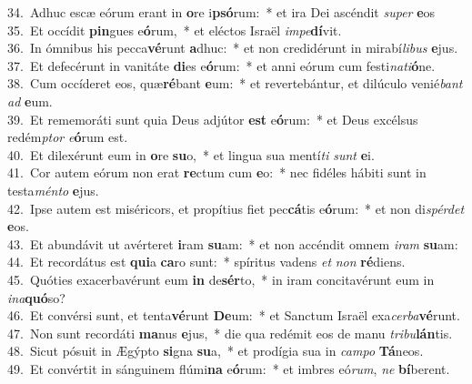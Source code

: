 {34.~}Adhuc escæ eórum erant in \textbf{o}re i\textbf{psó}rum:~* et ira Dei ascéndit \textit{su}\textit{per} \textbf{e}os\\
{35.~}Et occídit \textbf{pin}gues e\textbf{ó}rum,~* et eléctos Israël \textit{im}\textit{pe}\textbf{dí}vit.\\
{36.~}In ómnibus his pecca\textbf{vé}runt \textbf{a}dhuc:~* et non credidérunt in mirabí\textit{li}\textit{bus} \textbf{e}jus.\\
{37.~}Et defecérunt in vanitáte \textbf{di}es e\textbf{ó}rum:~* et anni eórum cum festi\textit{na}\textit{ti}\textbf{ó}ne.\\
{38.~}Cum occíderet eos, quæ\textbf{ré}bant \textbf{e}um:~* et revertebántur, et dilúculo venié\textit{bant} \textit{ad} \textbf{e}um.\\
{39.~}Et rememoráti sunt quia Deus adjútor \textbf{est} e\textbf{ó}rum:~* et Deus excélsus redém\textit{ptor} \textit{e}\textbf{ó}rum est.\\
{40.~}Et dilexérunt eum in \textbf{o}re \textbf{su}o,~* et lingua sua mentí\textit{ti} \textit{sunt} \textbf{e}i.\\
{41.~}Cor autem eórum non erat \textbf{re}ctum cum \textbf{e}o:~* nec fidéles hábiti sunt in testa\textit{mén}\textit{to} \textbf{e}jus.\\
{42.~}Ipse autem est miséricors, et propítius fiet pec\textbf{cá}tis e\textbf{ó}rum:~* et non di\textit{spér}\textit{det} \textbf{e}os.\\
{43.~}Et abundávit ut avérteret \textbf{i}ram \textbf{su}am:~* et non accéndit omnem \textit{i}\textit{ram} \textbf{su}am:\\
{44.~}Et recordátus est \textbf{qui}a \textbf{ca}ro sunt:~* spíritus vadens \textit{et} \textit{non} \textbf{ré}diens.\\
{45.~}Quóties exacerbavérunt eum \textbf{in} de\textbf{sér}to,~* in iram concitavérunt eum in \textit{i}\textit{na}\textbf{quó}so?\\
{46.~}Et convérsi sunt, et tenta\textbf{vé}runt \textbf{De}um:~* et Sanctum Israël exa\textit{cer}\textit{ba}\textbf{vé}runt.\\
{47.~}Non sunt recordáti \textbf{ma}nus \textbf{e}jus,~* die qua redémit eos de manu \textit{tri}\textit{bu}\textbf{lán}tis.\\
{48.~}Sicut pósuit in Ægýpto \textbf{si}gna \textbf{su}a,~* et prodígia sua in \textit{cam}\textit{po} \textbf{Tá}neos.\\
{49.~}Et convértit in sánguinem flúmi\textbf{na} e\textbf{ó}rum:~* et imbres eó\textit{rum}, \textit{ne} \textbf{bí}berent.\\
